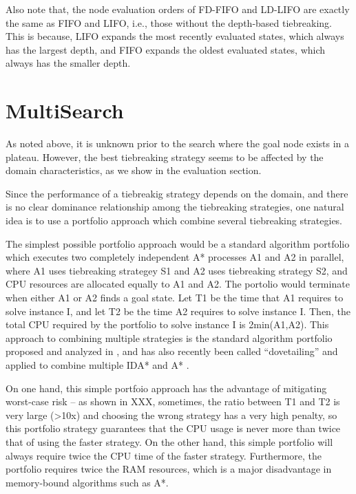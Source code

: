 Also note that, the node evaluation orders of FD-FIFO and LD-LIFO are
exactly the same as FIFO and LIFO, i.e., those without the depth-based
tiebreaking.  This is because, LIFO expands the most recently evaluated
states, which always has the largest depth, and FIFO expands the oldest
evaluated states, which always has the smaller depth.

 
\section{MultiSearch }

As noted above, it is unknown prior to the search where the goal node
exists in a plateau.
However, the best tiebreaking strategy seems to be affected by the domain
characteristics, as we show in the evaluation section.

Since the performance of a tiebreakig strategy depends on the domain, and there is no clear dominance relationship among the tiebreaking strategies, one natural 
idea is to use a portfolio approach which combine several tiebreaking strategies.

The simplest possible portfolio approach would be a standard algorithm portfolio
which executes two completely independent A* processes A1 and A2 in parallel, where A1 uses tiebreaking strategey S1 and A2 uses tiebreaking strategy S2, and CPU resources are allocated equally to A1 and A2.
The portolio would terminate when either A1 or A2 finds a goal state.
Let T1 be the time that A1 requires to solve instance I, and let T2 be the time A2 requires to solve instance I. Then, the total CPU required by the portfolio to solve instance I is 2min(A1,A2). This approach to combining multiple strategies is the standard algorithm portfolio proposed and analyzed in \cite{HubermanLH97,GomesS01}, and has also recently been called ``dovetailing'' and applied to combine multiple IDA* and A*  \cite{ValenzanoSSBK10}. %

On one hand, this simple portfoio approach has the advantage of mitigating worst-case risk -- as shown in XXX, sometimes, the ratio between T1 and T2 is very large (>10x) and choosing the wrong strategy has a very high penalty, so this portfolio strategy guarantees that the CPU usage is never more than twice that of using the faster strategy.
On the other hand, this simple portfolio will always require twice the CPU time of the faster strategy. Furthermore, the portfolio requires twice the RAM resources, which is a major disadvantage in memory-bound algorithms such as A*.


